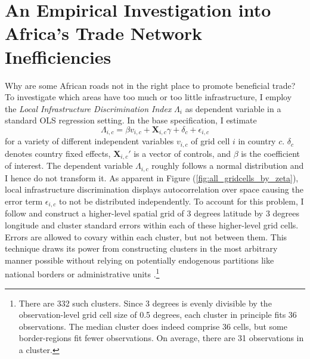 \documentclass[11pt, oneside]{article}   	%
\let\oldref\ref
\renewcommand{\ref}[1]{(\oldref{#1})}
\begin{document}
\section{An Empirical Investigation into Africa's Trade Network Inefficiencies}
\label{chap:results}
Why are some African roads not in the right place to promote beneficial trade? To investigate which areas have too much or too little infrastructure, I employ the \emph{Local Infrastructure Discrimination Index} $\Lambda_{i}$ as dependent variable in a standard OLS regression setting. In the base specification, I estimate
\begin{equation}
  \Lambda_{i,c} = \beta v_{i,c} + \textbf{X}_{i,c}\gamma + \delta_{c} + \epsilon_{i,c}
  \label{eq:grid_ols}
\end{equation}
for a variety of different independent variables $v_{i,c}$ of grid cell $i$ in country $c$. $\delta_{c}$ denotes country fixed effects, $\textbf{X}_{i,c}'$ is a vector of controls, and $\beta$ is the coefficient of interest. The dependent variable $\Lambda_{i,c}$ roughly follows a normal distribution and I hence do not transform it. As apparent in Figure \ref{fig:all_gridcells_by_zeta}, local infrastructure discrimination displays autocorrelation over space causing the error term $\epsilon_{i,c}$ to not be distributed independently. To account for this problem, I follow \cite{Bester_Inferencedependentdata_2011} and construct a higher-level spatial grid of 3 degrees latitude by 3 degrees longitude and cluster standard errors within each of these higher-level grid cells. Errors are  allowed to covary within each cluster, but not between them. This technique draws its power from constructing clusters in the most arbitrary manner possible without relying on potentially endogenous partitions like national borders or administrative units \citep[see e.g.][]{michaels_resetting_2017}.\footnote{There are 332 such clusters. Since 3 degrees is evenly divisible by the observation-level grid cell size of 0.5 degrees, each cluster in principle fits 36 observations. The median cluster does indeed comprise 36 cells, but some border-regions fit fewer observations. On average, there are 31 observations in a cluster.}
\end{document}
